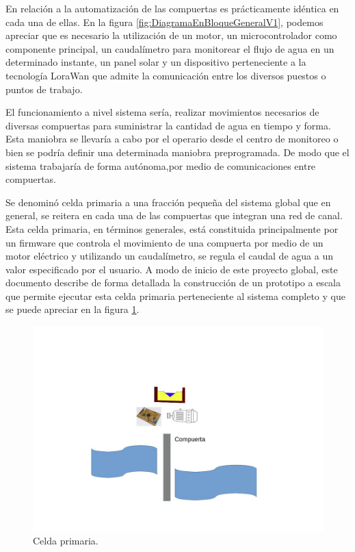 En relación a la automatización de las compuertas es prácticamente idéntica en cada una de ellas. En la figura \ref{fig:DiagramaEnBloqueGeneralV1}, podemos apreciar que es necesario la utilización de un motor, un microcontrolador como componente principal, un caudalímetro  para monitorear el flujo de agua en un determinado instante, un panel solar y un dispositivo perteneciente a la tecnología LoraWan que admite la comunicación entre los diversos puestos o puntos de trabajo.

El funcionamiento a nivel sistema sería, realizar movimientos necesarios de diversas compuertas para suministrar la cantidad de agua en tiempo y forma. Esta maniobra se llevaría a cabo por el operario desde el centro de monitoreo o bien se podría definir una determinada maniobra preprogramada. De modo que el sistema trabajaría de forma autónoma,por medio de comunicaciones entre compuertas.  


Se denominó celda primaria a una fracción pequeña del sistema global que en general, se reitera en cada una de las compuertas que integran una red de canal.
Esta celda primaria, en términos generales, está constituida principalmente por un firmware que controla el movimiento de una compuerta por medio de un motor eléctrico y utilizando un caudalímetro, se regula el caudal de agua a un valor especificado por el usuario.
A modo de inicio de este proyecto global, este documento describe de forma detallada la construcción de un prototipo a escala que permite ejecutar esta celda primaria perteneciente al sistema completo y que se puede apreciar en la figura \ref{fig:SistemaBase}.
\begin{figure}[htpb]
\centering
\includegraphics[scale=.40]{./Figures/SistemaBase-V2.jpg}
\caption{Celda primaria.}
\label{fig:SistemaBase}
\end{figure}



